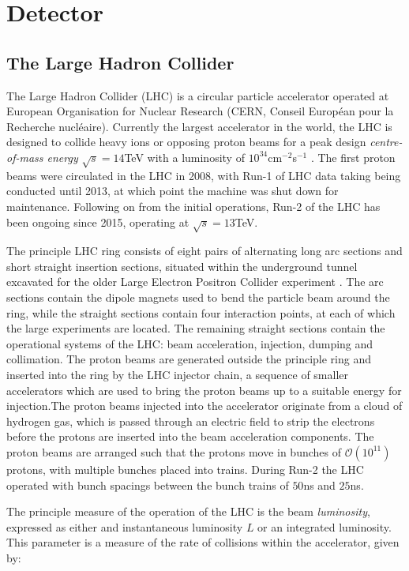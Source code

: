 \chapter{Detector}\label{c:Det}

\section{The Large Hadron Collider}

	The Large Hadron Collider (LHC) is a circular particle accelerator operated at European Organisation for Nuclear Research (CERN, Conseil Europ\'{e}an pour la Recherche nucl\'{e}aire). Currently the largest accelerator in the world, the LHC is designed to collide heavy ions or opposing proton beams for a peak design \textit{centre-of-mass energy} $\sqrt{s}=14$TeV with a luminosity of $10^{34}$cm$^{-2}$s$^{-1}$ \cite{lhc}. The first proton beams were circulated in the LHC in 2008, with Run-1 of LHC data taking being conducted until 2013, at which point the machine was shut down for maintenance. Following on from the initial operations, Run-2 of the LHC has been ongoing since 2015, operating at $\sqrt{s}=13$TeV.

	The principle LHC ring consists of eight pairs of alternating long arc sections and short straight insertion sections, situated within the underground tunnel excavated for the older Large Electron Positron Collider experiment \cite{lep1, lep2}. The arc sections contain the dipole magnets used to bend the particle beam around the ring, while the straight sections contain four interaction points, at each of which the large experiments are located. The remaining straight sections contain the operational systems of the LHC: beam acceleration, injection,  dumping and collimation. The proton beams are generated outside the principle ring and inserted into the ring by the LHC injector chain, a sequence of smaller accelerators which are used to bring the proton beams up to a suitable energy for injection.The proton beams injected into the accelerator originate from a cloud of hydrogen gas, which is passed through an electric field to strip the electrons before the protons are inserted into the beam acceleration components. The proton beams are arranged such that the protons move in bunches of $\mathcal{O}(10^{11})$ protons, with multiple bunches placed into trains. During Run-2 the LHC operated with bunch spacings between the bunch trains of $50$ns and $25$ns.

	The principle measure of the operation of the LHC is the beam \textit{luminosity}, expressed as either and instantaneous luminosity $L$ or an integrated luminosity. This parameter is a measure of the rate of collisions within the accelerator, given by:

